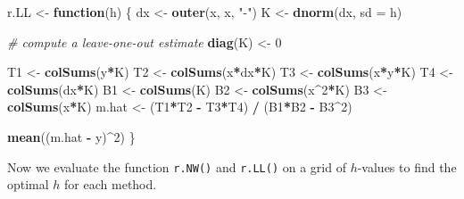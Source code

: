 \documentclass[
  a4paper,
]{article}
\newenvironment{Shaded}{\begin{snugshade}}{\end{snugshade}}
\newcommand{\AttributeTok}[1]{\textcolor[rgb]{0.13,0.29,0.53}{#1}}
\newcommand{\CommentTok}[1]{\textcolor[rgb]{0.56,0.35,0.01}{\textit{#1}}}
\newcommand{\ControlFlowTok}[1]{\textcolor[rgb]{0.13,0.29,0.53}{\textbf{#1}}}
\newcommand{\DecValTok}[1]{\textcolor[rgb]{0.00,0.00,0.81}{#1}}
\newcommand{\FunctionTok}[1]{\textcolor[rgb]{0.13,0.29,0.53}{\textbf{#1}}}
\newcommand{\NormalTok}[1]{#1}
\newcommand{\OtherTok}[1]{\textcolor[rgb]{0.56,0.35,0.01}{#1}}
\newcommand{\SpecialCharTok}[1]{\textcolor[rgb]{0.81,0.36,0.00}{\textbf{#1}}}
\newcommand{\StringTok}[1]{\textcolor[rgb]{0.31,0.60,0.02}{#1}}
\theoremstyle{definition}
\theoremstyle{definition}
\theoremstyle{definition}
\theoremstyle{definition}
\theoremstyle{remark}
\begin{document}
\begin{Shaded}
\begin{Highlighting}[]
\NormalTok{r.LL }\OtherTok{\textless{}{-}} \ControlFlowTok{function}\NormalTok{(h) \{}
\NormalTok{    dx }\OtherTok{\textless{}{-}} \FunctionTok{outer}\NormalTok{(x, x, }\StringTok{"{-}"}\NormalTok{)}
\NormalTok{    K }\OtherTok{\textless{}{-}} \FunctionTok{dnorm}\NormalTok{(dx, }\AttributeTok{sd =}\NormalTok{ h)}

    \CommentTok{\# compute a leave{-}one{-}out estimate}
    \FunctionTok{diag}\NormalTok{(K) }\OtherTok{\textless{}{-}} \DecValTok{0}

\NormalTok{    T1 }\OtherTok{\textless{}{-}} \FunctionTok{colSums}\NormalTok{(y}\SpecialCharTok{*}\NormalTok{K)}
\NormalTok{    T2 }\OtherTok{\textless{}{-}} \FunctionTok{colSums}\NormalTok{(x}\SpecialCharTok{*}\NormalTok{dx}\SpecialCharTok{*}\NormalTok{K)}
\NormalTok{    T3 }\OtherTok{\textless{}{-}} \FunctionTok{colSums}\NormalTok{(x}\SpecialCharTok{*}\NormalTok{y}\SpecialCharTok{*}\NormalTok{K)}
\NormalTok{    T4 }\OtherTok{\textless{}{-}} \FunctionTok{colSums}\NormalTok{(dx}\SpecialCharTok{*}\NormalTok{K)}
\NormalTok{    B1 }\OtherTok{\textless{}{-}} \FunctionTok{colSums}\NormalTok{(K)}
\NormalTok{    B2 }\OtherTok{\textless{}{-}} \FunctionTok{colSums}\NormalTok{(x}\SpecialCharTok{\^{}}\DecValTok{2}\SpecialCharTok{*}\NormalTok{K)}
\NormalTok{    B3 }\OtherTok{\textless{}{-}} \FunctionTok{colSums}\NormalTok{(x}\SpecialCharTok{*}\NormalTok{K)}
\NormalTok{    m.hat }\OtherTok{\textless{}{-}}\NormalTok{ (T1}\SpecialCharTok{*}\NormalTok{T2 }\SpecialCharTok{{-}}\NormalTok{ T3}\SpecialCharTok{*}\NormalTok{T4) }\SpecialCharTok{/}\NormalTok{ (B1}\SpecialCharTok{*}\NormalTok{B2 }\SpecialCharTok{{-}}\NormalTok{ B3}\SpecialCharTok{\^{}}\DecValTok{2}\NormalTok{)}

    \FunctionTok{mean}\NormalTok{((m.hat }\SpecialCharTok{{-}}\NormalTok{ y)}\SpecialCharTok{\^{}}\DecValTok{2}\NormalTok{)}
\NormalTok{\}}
\end{Highlighting}
\end{Shaded}

Now we evaluate the function \texttt{r.NW()} and \texttt{r.LL()} on a grid of \(h\)-values
to find the optimal \(h\) for each method.
\end{document}
